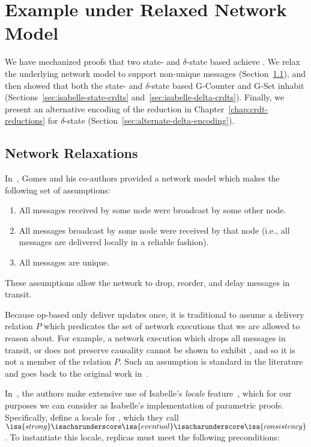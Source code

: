 \chapter{Example \CRDTs under Relaxed Network Model}
\label{chap:example-crdts}

We have mechanized proofs that two state- and $\delta$-state based \CRDTs
achieve \SEC. We relax the underlying network model to support non-unique
messages (Section~\ref{sec:network-relaxations}), and then showed that both the
state- and $\delta$-state based G-Counter and G-Set inhabit \SEC
(Sections~\ref{sec:isabelle-state-crdts} and~\ref{sec:isabelle-delta-crdts}).
Finally, we present an alternative encoding of the reduction in
Chapter~\ref{chap:crdt-reductions} for $\delta$-state \CRDTs
(Section~\ref{sec:alternate-delta-encoding}).

\section{Network Relaxations}
\label{sec:network-relaxations}
In~\citet{gomes17}, Gomes and his co-authors provided a network model which
makes the following set of assumptions:
\begin{enumerate}
  \item All messages received by some node were broadcast by some other node.
  \item All messages broadcast by some node were received by that node (i.e.,
    all messages are delivered locally in a reliable fashion).
  \item All messages are unique.
\end{enumerate}
These assumptions allow the network to drop, reorder, and delay messages in
transit.

Because op-based \CRDTs only deliver updates once, it is traditional to assume a
delivery relation $P$ which predicates the set of network executions that we are
allowed to reason about. For example, a network execution which drops all
messages in transit, or does not preserve causality cannot be shown to exhibit
\SEC, and so it is not a member of the relation $P$.  Such an assumption is
standard in the literature and goes back to the original work
in~\citet{shapiro11}.

In~\citet{gomes17}, the authors make extensive use of Isabelle's \emph{locale}
feature~\citep{wenzel02}, which for our purposes we can consider as Isabelle's
implementation of parametric proofs. Specifically, \citet{gomes17} define a
locale for \SEC, which they call
$\isa{strong}\isacharunderscore\isa{eventual}\isacharunderscore\isa{consistency}$.
To instantiate this locale, \CRDT replicas must meet the following
preconditions:

